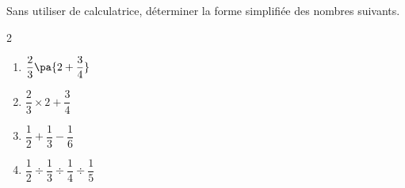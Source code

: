 \begin{exo}{}
	Sans utiliser de calculatrice, déterminer la forme simplifiée des nombres suivants.
	\vspace*{-2mm}\begin{multicols}{2}
		\begin{enumerate}[itemsep=2mm]
			\item $\dfrac{2}{3}\pa{2 + \dfrac{3}{4}}$
			\item $\dfrac{2}{3} \times 2 + \dfrac{3}{4}$
			\item $\dfrac{1}{2} + \dfrac{1}{3} - \dfrac{1}{6}$
			\item $\dfrac{1}{2} \div \dfrac{1}{3} \div \dfrac{1}{4} \div \dfrac{1}{5}$
		\end{enumerate}
	\end{multicols}\vspace*{-2mm}
\end{exo}
